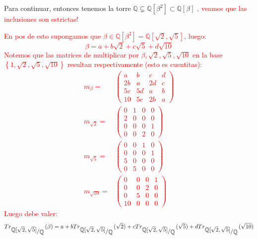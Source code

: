\documentclass[11pt]{article}
\newcommand{\Q}{\mathbb{Q}}
\newcommand{\sett}[1]{\left\lbrace#1\right\rbrace}
\newcommand{\quotient}[2]{{\raisebox{.2em}{$#1$}\left/\raisebox{-.2em}{$#2$}\right.}}
\numberwithin{theorem}{subsection}
\begin{document}
\begin{enumerate}
\begin{itemize}
		Para continuar, entonces tenemos la torre $\Q \subsetneq \Q[\beta^2] \subset \Q[\beta]$ \textcolor{red}{, veamos que las inclusiones son estrictas!} 
		
		\textcolor{red}{En pos de esto supongamos que $\beta \in \Q[\beta^2] = \Q[\sqrt{2}, \sqrt{5}]$, luego:
		\begin{equation*}
			\beta = a + b\sqrt{2} + c\sqrt{5} + d\sqrt{10}
		\end{equation*}
		Notemos que las matrices de multiplicar por $\beta, \sqrt{2}, \sqrt{5}, \sqrt{10}$ en la base $\sett{1, \sqrt{2}, \sqrt{5}, \sqrt{10}}$ resultan respectivamente (esto es cuentitas):
		\begin{equation*}
		\begin{aligned}
		m_{\beta} = & \left( 
		\begin{array}{cccc}
		a & b & c & d \\
		2b & a & 2d & c \\
		5c & 5d & a & b \\
		10 & 5c & 2b & a
		\end{array}
		\right) \\
		m_{\sqrt{2}} = & \left(
		\begin{array}{cccc}
		0 & 1 & 0 & 0 \\
		2 & 0 & 0 & 0 \\
		0 & 0 & 0 & 1 \\
		0 & 0 & 2 & 0
		\end{array}
		\right) \\
		m_{\sqrt{5}} = & \left(
		\begin{array}{cccc}
		0 & 0 & 1 & 0 \\
		0 & 0 & 0 & 1 \\
		5 & 0 & 0 & 0 \\
		0 & 5 & 0 & 0
		\end{array}
		\right) \\
		m_{\sqrt{10}} = & \left(
		\begin{array}{cccc}
		0 & 0 & 0 & 1 \\
		0 & 0 & 2 & 0 \\
		0 & 5 & 0 & 0 \\
		10 & 0 & 0 & 0
		\end{array}
		\right) 
		\end{aligned}
		\end{equation*}
		Luego debe valer:
		\begin{equation*}
			Tr_{\quotient{\Q[\sqrt{2}, \sqrt{5}]}{\Q}}(\beta) = a + b Tr_{\quotient{\Q[\sqrt{2}, \sqrt{5}]}{\Q}}(\sqrt{2}) + c Tr_{\quotient{\Q[\sqrt{2}, \sqrt{5}]}{\Q}}(\sqrt{5}) + d Tr_{\quotient{\Q[\sqrt{2}, \sqrt{5}]}{\Q}}(\sqrt{10}) 

\end{equation*}}
\end{itemize}
\end{enumerate}
\end{document}
